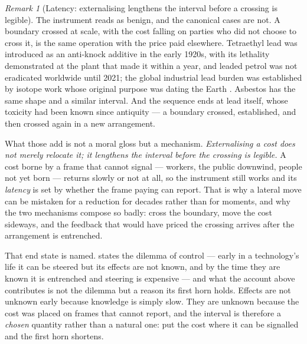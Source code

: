 \documentclass[11pt,a4paper]{article}
\theoremstyle{remark}\newtheorem{remark}[definition]{Remark}
\begin{document}
\begin{remark}[Latency: externalising lengthens the interval before a crossing is legible]\label{rem:crossing-latency}
The instrument reads as benign, and the canonical cases are not. A
boundary crossed at scale, with the cost falling on parties who did not choose to cross it, is the same
operation with the price paid elsewhere. Tetraethyl lead was introduced as an anti-knock additive in the
early 1920s, with its lethality demonstrated at the plant that made it within a year, and leaded petrol
was not eradicated worldwide until 2021; the global industrial lead burden was established by isotope
work whose original purpose was dating the Earth \citep{patterson1965}. Asbestos has the same shape and
a similar interval. And the sequence ends at lead itself, whose toxicity had been known since antiquity
--- a boundary crossed, established, and then crossed again in a new arrangement.

What those add is not a moral gloss but a mechanism. \emph{Externalising a cost
does not merely relocate it; it lengthens the interval before the crossing is legible.} A cost borne by
a frame that cannot signal --- workers, the public downwind, people not yet born --- returns slowly or
not at all, so the instrument still works and its \emph{latency} is set by whether the frame paying can
report. That is why a lateral move can be mistaken for a reduction for decades rather than for moments, and
why the two mechanisms compose so badly: cross the boundary, move the cost sideways, and the feedback
that would have priced the crossing arrives after the arrangement is entrenched.

That end state is named. \citet{collingridge1980} states the dilemma of control --- early in a
technology's life it can be steered but its effects are not known, and by the time they are known it is
entrenched and steering is expensive --- and what the account above contributes is not the dilemma but a
reason its first horn holds. Effects are not unknown early because knowledge is simply slow. They are
unknown because the cost was placed on frames that cannot report, and the interval is therefore a
\emph{chosen} quantity rather than a natural one: put the cost where it can be signalled and the first
horn shortens.
\end{remark}
\end{document}
